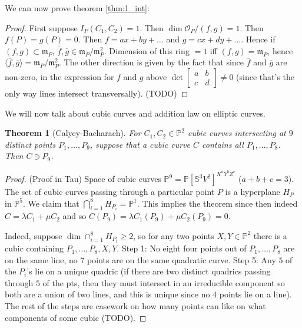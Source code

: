 \documentclass[12pt]{article}
\renewcommand{\P}{\mathbb{P}}
\renewcommand{\S}{\mathbb{S}}
\newcommand{\m}{\mathfrak{m}}
\renewcommand{\O}{\mathcal{O}}
\newtheorem{theorem}{Theorem}[section]
\begin{document}
    We can now prove theorem \ref{thm:1_int}:
    \begin{proof}
        First suppose $I_P(C_1, C_2) = 1$. Then $\dim \O_P/(f, g) = 1$. Then $f(P) = g(P) = 0$. Then $f = ax+by + \dots $ and $g = cx + dy + ...$. Hence if $(f, g) \subset \m_P$, $\overline{f}, \overline{g} \in \m_P/\m_P^2$. Dimension of this ring $=1$ iff $(f, g) = \m_P$, hence $\langle \overline{f}, \overline{g} \rangle = \m_P/\m_P^2$. The other direction is given by the fact that since $\overline{f}$ and $\overline{g}$ are non-zero, in the expression for $f$ and $g$ above $\det \begin{bmatrix}
            a & b \\
            c & d
        \end{bmatrix} \neq 0$ (since that's the only way lines intersect transversally). (TODO)
    \end{proof}
    We will now talk about cubic curves and addition law on elliptic curves. 
    \begin{theorem}
        [Calyey-Bacharach] For $C_1, C_2 \in \P^2$ cubic curves intersecting at $9$ distinct points $P_1, \dots, P_9$, suppose that a cubic curve $C$ contains all $P_1, \dots, P_8$. Then $C \ni P_9$. 
    \end{theorem}
    \begin{proof}
        (Proof in Tau) Space of cubic curves $\P^9 = \P[\S^3V^2]^{X^aY^bZ^c}$ ($a + b + c = 3$). The set of cubic curves passing through a particular point $P$ is a hyperplane $H_P$ in $\P^5$. We claim that $\bigcap_{i=1}^8 H_{P_i} = \P^1$. This implies the theorem since then indeed $C = \lambda C_1 + \mu C_2$ and so $C(P_9) = \lambda C_1(P_9) + \mu C_2(P_9) = 0$. \par 
        Indeed, suppose $\dim \cap_{i=1}^8 H_{P_i} \geq 2$, so for any two points $X, Y \in \P^2$ there is a cubic containing $P_1, \dots, P_8, X, Y$. Step 1: No eight four points out of $P_1, \dots, P_8$ are on the same line, no $7$ points are on the same quadratic curve. Step 5: Any $5$ of the $P_i$'s lie on a unique quadric (if there are two distinct quadrics passing through $5$ of the pts, then they must intersect in an irreducible component so both are a union of two lines, and this is unique since no $4$ points lie on a line). The rest of the steps are casework on how many points can like on what components of some cubic (TODO). 
    \end{proof}
\end{document}
